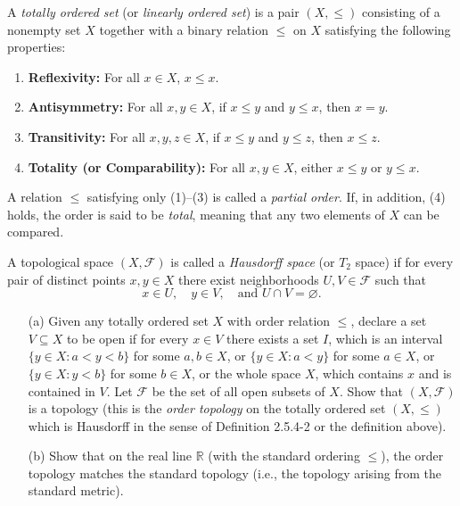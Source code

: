  \begin{problem}[20pts]
    \vphantom{text}
    \begin{definition}\label{def:total-order}
A \emph{totally ordered set} (or \emph{linearly ordered set}) is a pair $(X, \leq)$ consisting of a nonempty set $X$ together with a binary relation $\leq$ on $X$ satisfying the following properties:
\begin{enumerate}
    \item \textbf{Reflexivity:} For all $x \in X$, $x \leq x$.
    \item \textbf{Antisymmetry:} For all $x, y \in X$, if $x \leq y$ and $y \leq x$, then $x = y$.
    \item \textbf{Transitivity:} For all $x, y, z \in X$, if $x \leq y$ and $y \leq z$, then $x \leq z$.
    \item \textbf{Totality (or Comparability):} For all $x, y \in X$, either $x \leq y$ or $y \leq x$.
\end{enumerate}
A relation $\leq$ satisfying only (1)--(3) is called a \emph{partial order}.  
If, in addition, (4) holds, the order is said to be \emph{total}, meaning that any two elements of $X$ can be compared.
\end{definition}


\begin{definition}
A topological space $(X,\mathcal{F})$ is called a \emph{Hausdorff space} (or $T_2$ space) if for every pair of distinct points $x,y \in X$ there exist neighborhoods 
$U,V \in \mathcal{F}$ such that
\[
x \in U, \quad y \in V, \quad \text{and } U \cap V = \varnothing.
\]
\end{definition}
  \begin{enumerate}
  \item[(a)] Given any totally ordered set $X$ with order relation $\le$, declare a set $V \subseteq X$ to be open if for every $x \in V$ there exists a set $I$, which is an interval  
$\{y \in X : a < y < b\}$ for some $a, b \in X$, or  
$\{y \in X : a < y\}$ for some $a \in X$, or  
$\{y \in X : y < b\}$ for some $b \in X$, or the whole space $X$, which contains $x$ and is contained in $V$.  
Let $\mathcal{F}$ be the set of all open subsets of $X$.  
Show that $(X, \mathcal{F})$ is a topology (this is the \emph{order topology} on the totally ordered set $(X, \le)$ which is Hausdorff in the sense of  Definition 2.5.4-2 or the definition above).  


\medskip
\item[(b)] 
Show that on the real line $\mathbb{R}$ (with the standard ordering $\le$), the order topology matches the standard topology (i.e., the topology arising from the standard metric).  


\end{enumerate}
\end{problem}
